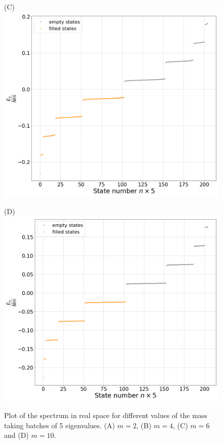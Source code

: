 \begin{figure}[htb]
\begin{minipage}{.5\textwidth}
		\centering(C)
		\includegraphics[scale=0.18]{figures/FreeFullSpec_m6.png}
	\end{minipage}%
	\begin{minipage}{0.5\textwidth}
		\centering(D)
		\includegraphics[scale=0.18]{figures/FreeFullSpec_m10.png}
	\end{minipage}
	\caption{Plot of the spectrum in real space for different values of the mass taking batches of 5 eigenvalues. (A) $m=2$, (B) $m=4$, (C) $m=6$ and (D) $m=10$.}\label{fig:SpecMassive}
\end{figure}


